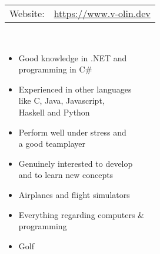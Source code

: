 \documentclass[11pt,oneside,a4paper,titlepage]{article}
\begin{document}
\begin{tcolorbox}
\begin{minipage}[t]{8cm}
\begin{tcolorbox}[grow to left by=15pt,colframe=sup-lgray,colback=sup-lgray,sharp corners]
{\begin{tabular}{l l}
                    Website: & \href{https://www.v-olin.dev}{https://www.v-olin.dev} \\
                \end{tabular} \\
                \begin{itemize}
                    \item{Good knowledge in .NET and\\programming in C\#}
                    \item{Experienced in other languages\\like C, Java, Javascript,\\Haskell and Python}
                    \item{Perform well under stress and\\a good teamplayer} %
                    \item{Genuinely interested to develop\\ and to learn new concepts}%
                    \vspace*{10pt}
                \end{itemize}
                \begin{itemize}
                    \item{Airplanes and flight simulators}
                    \item{Everything regarding computers \& \\programming}
                    \item{Golf\\\\\\\\\\\\}
                \end{itemize}
            }            
        \end{tcolorbox}
    \end{minipage}
    \begin{minipage}[t]{12cm}
        \vspace*{-18.2pt}

\end{minipage}
\end{tcolorbox}
\end{document}
